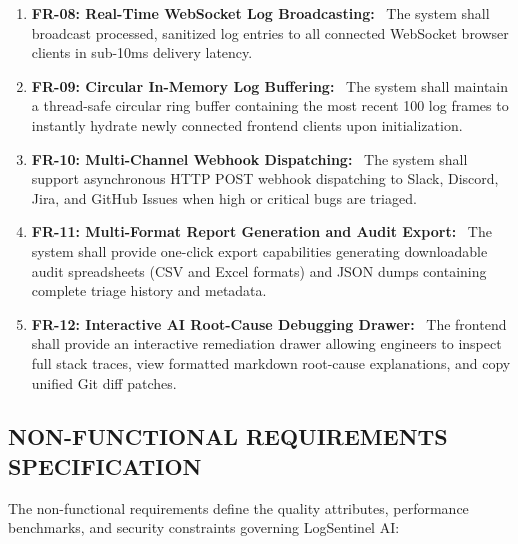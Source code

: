 \documentclass[12pt,a4paper]{article}
\newcommand{\lead}[1]{\textbf{#1}\ }
\begin{document}
\begin{enumerate}[leftmargin=1.5em,itemsep=6pt]
    \item \lead{FR-08: Real-Time WebSocket Log Broadcasting:} The system shall broadcast processed, sanitized log entries to all connected WebSocket browser clients in sub-10ms delivery latency.
    \item \lead{FR-09: Circular In-Memory Log Buffering:} The system shall maintain a thread-safe circular ring buffer containing the most recent 100 log frames to instantly hydrate newly connected frontend clients upon initialization.
    \item \lead{FR-10: Multi-Channel Webhook Dispatching:} The system shall support asynchronous HTTP POST webhook dispatching to Slack, Discord, Jira, and GitHub Issues when high or critical bugs are triaged.
    \item \lead{FR-11: Multi-Format Report Generation and Audit Export:} The system shall provide one-click export capabilities generating downloadable audit spreadsheets (CSV and Excel formats) and JSON dumps containing complete triage history and metadata.
    \item \lead{FR-12: Interactive AI Root-Cause Debugging Drawer:} The frontend shall provide an interactive remediation drawer allowing engineers to inspect full stack traces, view formatted markdown root-cause explanations, and copy unified Git diff patches.
\end{enumerate}

\clearpage
\subsection{NON-FUNCTIONAL REQUIREMENTS SPECIFICATION}
The non-functional requirements define the quality attributes, performance benchmarks, and security constraints governing LogSentinel AI:
\end{document}
